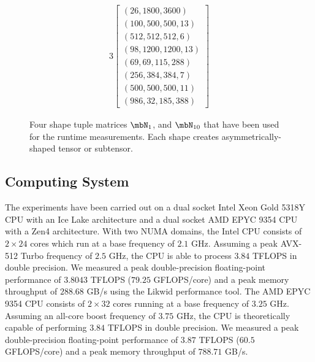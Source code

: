 \begin{figure*}[t]
\begin{footnotesize}
\begin{alignat*}{3}
\begin{bmatrix}
(26,1800,3600)\\
(100, 500, 500, 13)\\
(512, 512, 512,  6)\\
(98,1200,1200, 13) \\
(69,  69, 115,288)\\
(256, 384, 384,  7)\\
(500, 500, 500, 11)\\
(986,  32, 185,388)
\end{bmatrix}
\end{alignat*}
\end{footnotesize}
\caption[Shape Matrix]
{
Four shape tuple matrices $\mbN_1$, and $\mbN_{10}$ that have been used for the runtime measurements.
Each shape creates asymmetrically-shaped tensor or subtensor. 
}
\label{fig:tensor.shapes}
\end{figure*}
\subsection{Computing System} 
The experiments have been carried out on a dual socket Intel Xeon Gold 5318Y CPU with an Ice Lake architecture and a dual socket AMD EPYC 9354 CPU with a Zen4 architecture.
With two NUMA domains, the Intel CPU consists of $2\times24$ cores which run at a base frequency of $2.1$ GHz.
Assuming a peak AVX-512 Turbo frequency of $2.5$ GHz, the CPU is able to process $3.84$ TFLOPS in double precision.
We measured a peak double-precision floating-point performance of $3.8043$ TFLOPS ($79.25$ GFLOPS/core) and a peak memory throughput of $288.68$ GB/s using the Likwid performance tool.
The AMD EPYC 9354 CPU consists of $2\times32$ cores running at a base frequency of $3.25$ GHz.
Assuming an all-core boost frequency of $3.75$ GHz, the CPU is theoretically capable of performing $3.84$ TFLOPS in double precision.
We measured a peak double-precision floating-point performance of $3.87$ TFLOPS ($60.5$ GFLOPS/core) and a peak memory throughput of $788.71$ GB/s.
 
